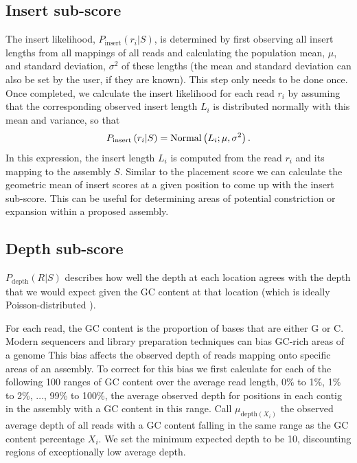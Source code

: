 \documentclass[phd,tocprelim]{cornell}
\begin{document}
\subsection{Insert sub-score} %
\label{sub:Insert sub-score}

The insert likelihood, $P_{\text{insert}}\left(r_{i}|S\right)$, is determined by first observing all insert lengths from all mappings of all reads and calculating the population mean, $\mu$, and standard deviation, $\sigma^{2}$ of these lengths (the mean and standard deviation can also be set by the user, if they are known). This step only needs to be done once.  Once completed, we calculate the insert likelihood for each read $r_{i}$ by assuming that the corresponding observed insert length $L_{i}$ is distributed normally with this mean and variance, so that
\begin{equation}
    P_{\text{insert}}\left(r_{i}|S\right) = {\rm Normal}\left(L_{i};\mu,\sigma^{2}\right).
\end{equation}
In this expression, the insert length $L_{i}$ is computed from the read $r_{i}$ and its mapping to the assembly $S$. Similar to the placement score we can calculate the geometric mean of insert scores at a given position to come up with the insert sub-score. This can be useful for determining areas of potential constriction or expansion within a proposed assembly.


\subsection{Depth sub-score} %
\label{sub:Depth sub-score}

$P_{\text{depth}}(R|S)$ describes how well the depth at each location agrees with the depth that we would expect given the GC content at that location (which is ideally Poisson-distributed \cite{Lander1988}).

For each read, the GC content is the proportion of bases that are either G or C. Modern sequencers and library preparation techniques can bias GC-rich areas of a genome \cite{Aird2011} This bias affects the observed depth of reads mapping onto specific areas of an assembly. To correct for this bias we first calculate for each of the following 100 ranges of GC content over the average read length, 0\% to 1\%, 1\% to 2\%, $\ldots$, 99\% to 100\%, the average observed depth for positions in each contig in the assembly with a GC content in this range. Call $\mu_{\text{depth}(X_{i})}$ the observed average depth of all reads with a GC content falling in the same range as the GC content percentage $X_{i}$. We set the minimum expected depth to be 10, discounting regions of exceptionally low average depth.
\end{document}
